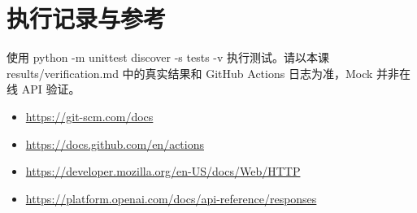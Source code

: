 \documentclass[UTF8,11pt,a4paper]{ctexart}
\begin{document}
\section{执行记录与参考}
使用 python -m unittest discover -s tests -v 执行测试。请以本课 results/verification.md 中的真实结果和 GitHub Actions 日志为准，Mock 并非在线 API 验证。
\begin{itemize}
\item \url{https://git-scm.com/docs}
\item \url{https://docs.github.com/en/actions}
\item \url{https://developer.mozilla.org/en-US/docs/Web/HTTP}
\item \url{https://platform.openai.com/docs/api-reference/responses}
\end{itemize}
\end{document}
